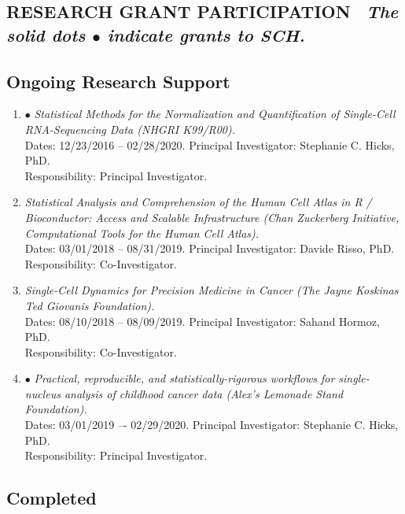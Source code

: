 \documentclass[10pt]{article}
\newcommand{\dn}[1]{{\color{black} {#1}}}
\newcommand{\mydot}[1]{\begin{enumerate}[label=$\circ$,leftmargin=\parindent]\setlength{\itemsep}{#1}}
\newcommand{\ee}{\end{enumerate}}
\begin{document}
\subsection*{RESEARCH GRANT PARTICIPATION  \ {\tiny \em  The solid dots $\bullet$ indicate grants to SCH.}}

\smallskip

\subsection*{Ongoing Research Support}

\mydot{0.3em}

\item[$\bullet$]
{\it Statistical Methods for the Normalization and Quantification of Single-Cell RNA-Sequencing Data (NHGRI K99/R00).}\\[0.0em]
\dn{Dates:} 12/23/2016 -- 02/28/2020. 
\dn{Principal Investigator:} Stephanie C. Hicks, PhD.\\
\dn{Responsibility:} Principal Investigator.

\item
{\it Statistical Analysis and Comprehension of the Human Cell Atlas in R / Bioconductor: Access and Scalable Infrastructure (Chan Zuckerberg Initiative, Computational Tools for the Human Cell Atlas).}\\[0.0em]
\dn{Dates:} 03/01/2018 -- 08/31/2019.
\dn{Principal Investigator:} Davide Risso, PhD.\\
\dn{Responsibility:} Co-Investigator.

\item
{\it Single-Cell Dynamics for Precision Medicine in Cancer (The Jayne Koskinas Ted Giovanis Foundation).}\\[0.0em]
\dn{Dates:} 08/10/2018 -- 08/09/2019. 
\dn{Principal Investigator:} Sahand Hormoz, PhD.\\
\dn{Responsibility:} Co-Investigator.

\item[$\bullet$]
{\it Practical, reproducible, and statistically-rigorous workflows for single-nucleus analysis of childhood cancer data (Alex’s Lemonade Stand Foundation).}\\[0.0em]
\dn{Dates:} 03/01/2019 –- 02/29/2020. 
\dn{Principal Investigator:} Stephanie C. Hicks, PhD.\\
\dn{Responsibility:} Principal Investigator.

\ee

\subsection*{Completed}
\end{document}
